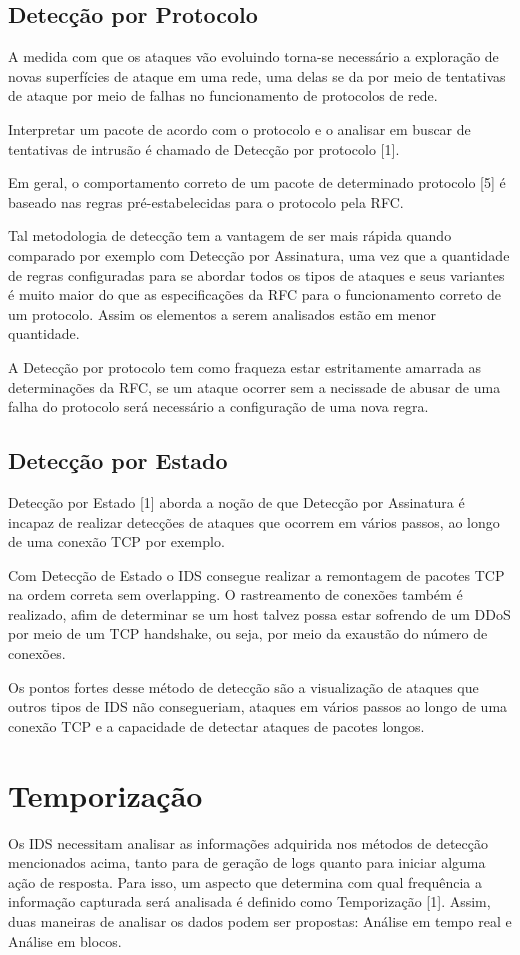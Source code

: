 \documentclass[conference]{IEEEtran}
\begin{document}
\subsection{Detecção por Protocolo}
A medida com que os ataques vão evoluindo torna-se necessário a exploração de novas superfícies de ataque em uma rede, uma delas se da por meio de tentativas de ataque por meio de falhas no funcionamento de protocolos de rede. 

Interpretar um pacote de acordo com o protocolo e o analisar em buscar de tentativas de intrusão é chamado de Detecção por protocolo [1]. 

Em geral, o comportamento correto de um pacote de determinado protocolo [5] é baseado nas regras pré-estabelecidas para o protocolo pela RFC. 

Tal metodologia de detecção tem a vantagem de ser mais rápida quando comparado por exemplo com Detecção por Assinatura, uma vez que a quantidade de regras configuradas para se abordar todos os tipos de ataques e seus variantes é muito maior do que as especificações da RFC para o funcionamento correto de um protocolo. Assim os elementos a serem analisados estão em menor quantidade.

A Detecção por protocolo tem como fraqueza estar estritamente amarrada as determinações da RFC, se um ataque ocorrer sem a necissade de abusar de uma falha do protocolo será necessário a configuração de uma nova regra.

\subsection{Detecção por Estado}
Detecção por Estado [1] aborda a noção de que Detecção por Assinatura é incapaz de realizar detecções de ataques que ocorrem em vários passos, ao longo de uma conexão TCP por exemplo.

Com Detecção de Estado o IDS consegue realizar a remontagem de pacotes TCP na ordem correta sem overlapping. O rastreamento de conexões também é realizado, afim de determinar se um host talvez possa estar sofrendo de um DDoS por meio de um TCP handshake, ou seja, por meio da exaustão do número de conexões.

Os pontos fortes desse método de detecção são a visualização de ataques que outros tipos de IDS não consegueriam, ataques em vários passos ao longo de uma conexão TCP e a capacidade de detectar ataques de pacotes longos.

\section{Temporização}
Os IDS necessitam analisar as informações adquirida nos métodos de detecção mencionados acima, tanto para de geração de logs quanto para iniciar alguma ação de resposta. Para isso, um aspecto que determina com qual frequência a informação capturada será analisada é definido como Temporização [1]. Assim, duas maneiras de analisar os dados podem ser propostas: Análise em tempo real e Análise em blocos.
\end{document}
